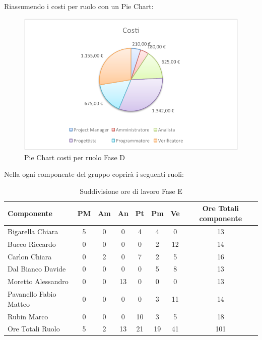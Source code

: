 				Riassumendo i costi per ruolo con un Pie Chart:
				\begin{figure}[H]\centering
					\includegraphics[width=\textwidth]{PianoDiProgetto/Pics/ChartTotCostiFaseD.pdf}
					\caption{Pie Chart costi per ruolo Fase D}
				\end{figure}
				Nella  ogni componente del gruppo \groupname{} coprirà i seguenti ruoli:
				\begin{table}[H]
					\begin{center}
						\begin{tabular}{| l | c | c | c | c | c | c | c |}
							\hline
							Componente 					& PM	& Am	& An 	& Pt 		& Pm 		& Ve 	& Ore Totali componente \\ \hline
							
							Bigarella Chiara 			& 5 	& 0		& 0		& 4			& 4 		& 0		& 13 \\
							Bucco Riccardo 				& 0		& 0		& 0		& 0			& 2			& 12 	& 14 \\
							Carlon Chiara	 			& 0		& 2 	& 0		& 7 		& 2 		& 5 	& 16 \\
							Dal Bianco Davide 			& 0		& 0		& 0		& 0			& 5 		& 8 	& 13 \\
							Moretto Alessandro 			& 0		& 0		& 13 	& 0			& 0			& 0		& 13 \\
							Pavanello Fabio Matteo	 	& 0		& 0		& 0		& 0			& 3 		&11 	& 14 \\
							Rubin Marco					& 0		& 0 	& 0		& 10 		& 3 		& 5		& 18 \\ \hline \hline
							
							Ore Totali Ruolo 			& 5 	& 2 	& 13 	& 21 		& 19 		& 41 	& 101\\ \hline
						\end{tabular}
					\end{center}
					\caption{Suddivisione ore di lavoro Fase E}
				\end{table}

